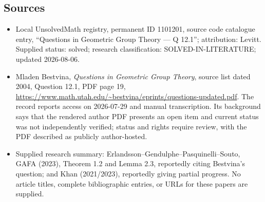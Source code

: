 \documentclass[11pt]{article}
\begin{document}
\subsection{Sources}
\begin{itemize}
\item Local UnsolvedMath registry, permanent ID 1101201, source code catalogue entry, ``Questions in Geometric Group Theory --- Q 12.1''; attribution: Levitt. Supplied status: solved; research classification: SOLVED-IN-LITERATURE; updated 2026-08-06.
\item Mladen Bestvina, \emph{Questions in Geometric Group Theory}, source list dated 2004, Question 12.1, PDF page 19, \url{https://www.math.utah.edu/~bestvina/eprints/questions-updated.pdf}. The record reports access on 2026-07-29 and manual transcription. Its background says that the rendered author PDF presents an open item and current status was not independently verified; status and rights require review, with the PDF described as publicly author-hosted.
\item Supplied research summary: Erlandsson--Gendulphe--Pasquinelli--Souto, GAFA (2023), Theorem 1.2 and Lemma 2.3, reportedly citing Bestvina's question; and Khan (2021/2023), reportedly giving partial progress. No article titles, complete bibliographic entries, or URLs for these papers are supplied.
\end{itemize}
\end{document}
